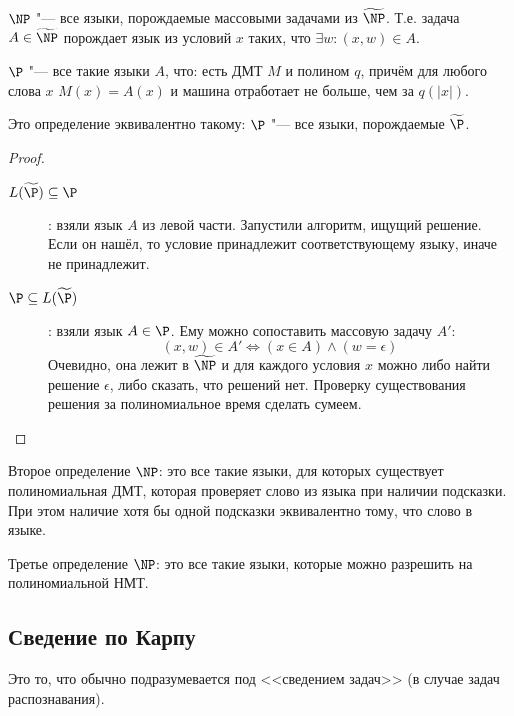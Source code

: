 	\begin{Def}
		$\NP$ "--- все языки, порождаемые массовыми задачами из $\widetilde{\NP}$.
		Т.е. задача $A \in \widetilde{\NP}$ порождает язык из условий $x$ таких, что $\exists w \colon (x, w) \in A$.
	\end{Def}
	\begin{Def}
		$\P$ "--- все такие языки $A$, что: есть ДМТ $M$ и полином $q$, причём для любого слова $x$ $M(x)=A(x)$ и машина отработает не больше, чем за $q(|x|)$.
	\end{Def}
	\begin{assertion}
		Это определение эквивалентно такому: $\P$ "--- все языки, порождаемые $\widetilde{\P}$.
	\end{assertion}
	\begin{proof}
		\begin{description}
			\item[$L(\widetilde{\P}) \subseteq \P$]:
				взяли язык $A$ из левой части.
				Запустили алгоритм, ищущий решение.
				Если он нашёл, то условие принадлежит соответствующему языку, иначе не принадлежит.
			\item[$\P \subseteq L(\widetilde{\P})$]:
				взяли язык $A \in \P$.
				Ему можно сопоставить массовую задачу $A'$:
				\[ (x, w) \in A' \iff (x \in A) \land (w=\epsilon) \]
				Очевидно, она лежит в $\widetilde{\NP}$ и для каждого условия $x$ можно либо найти решение $\epsilon$, либо сказать, что решений нет.
				Проверку существования решения за полиномиальное время сделать сумеем.
		\end{description}
	\end{proof}

	\begin{assertion}
		Второе определение $\NP$: это все такие языки, для которых существует полиномиальная ДМТ, которая проверяет слово из языка при наличии подсказки.
		При этом наличие хотя бы одной подсказки эквивалентно тому, что слово в языке.
	\end{assertion}
	\begin{assertion}
		Третье определение $\NP$: это все такие языки, которые можно разрешить на полиномиальной НМТ.
	\end{assertion}

\subsection{Сведение по Карпу}
	Это то, что обычно подразумевается под <<сведением задач>> (в случае задач распознавания).

